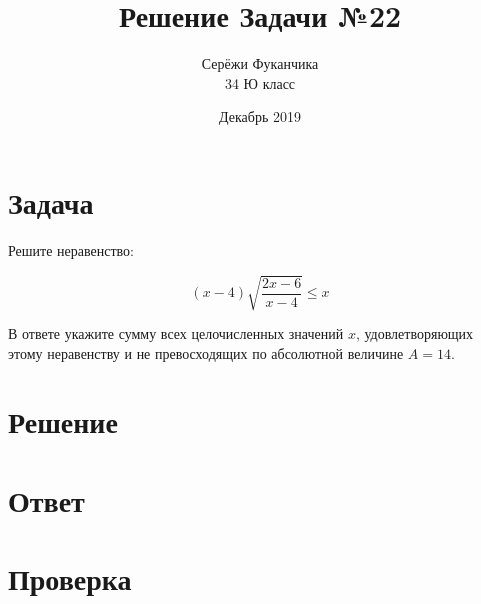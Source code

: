 \documentclass{article}
\title{Решение Задачи №22}
\author{Серёжи Фуканчика\\34 Ю класс}
\date{Декабрь 2019}
\begin{document}
\maketitle

\section{Задача}
Решите неравенство:

$$(x-4)\sqrt{\frac{2x-6}{x-4}}\le{}x$$

В ответе укажите сумму всех целочисленных значений $x$, удовлетворяющих этому неравенству и не превосходящих по абсолютной величине $A=14$.

\section{Решение}

\section{Ответ}

\section{Проверка}
\end{document}

